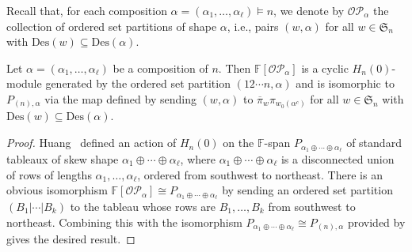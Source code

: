 \documentclass[ALCO,ThmDefs,published]{cedram}
\newcommand{\symm}{{\mathfrak{S}}}
\newcommand{\FF}{{\mathbb{F}}}
\theoremstyle{plain}
\newcommand{\Des}{{\mathrm {Des}}}
\newcommand{\symm}{{\mathfrak{S}}}
\newcommand{\OP}{{\mathcal{OP}}}
\newcommand{\FF}{{\mathbb{F}}}
\newcommand{\pib}{\overline{\pi}}
\begin{document}


Recall that, for each composition $\alpha=(\alpha_1,\ldots,\alpha_\ell) \models n$, we denote by $\OP_{\alpha}$ the collection of ordered set partitions of shape $\alpha$, i.e., pairs $(w,\alpha)$ for all $w\in\symm_n$ with $\Des(w)\subseteq \Des(\alpha)$.

\begin{lemma}
\label{osp-substructure}
Let $\alpha = (\alpha_1,\ldots,\alpha_\ell)$ be a composition of $n$. Then $\FF[\OP_\alpha]$ is a cyclic $H_n(0)$-module generated by the ordered set partition $(12\cdots n,\alpha)$ and is isomorphic to $P_{(n),\alpha}$ via the map defined by sending $(w,\alpha)$ to $\pib_w \pi_{w_0(\alpha^c)}$ for all $w\in\symm_n$ with $\Des(w)\subseteq \Des(\alpha)$.
\end{lemma}

\begin{proof}

Huang~\cite[(3.3)]{HuangTab} defined an action of $H_n(0)$ on the $\FF$-span $P_{\alpha_1\oplus\cdots\oplus\alpha_\ell}$ of standard tableaux of skew shape $\alpha_1\oplus\cdots\oplus\alpha_\ell$, where $\alpha_1\oplus\cdots\oplus\alpha_\ell$ is a disconnected union of rows of lengths $\alpha_1,\ldots,\alpha_\ell$, ordered from southwest to northeast. 
There is an obvious isomorphism $\FF[\OP_\alpha] \cong P_{\alpha_1\oplus\cdots\oplus\alpha_\ell}$ by sending an ordered set partition $(B_1|\cdots|B_k)$ to the tableau whose rows are $B_1,\ldots,B_k$ from southwest to northeast. 
Combining this with the isomorphism $P_{\alpha_1\oplus\cdots\oplus\alpha_\ell} \cong P_{(n),\alpha}$ provided by \cite[Thm. 3.3]{HuangTab} gives the desired result.
\end{proof}
\end{document}
